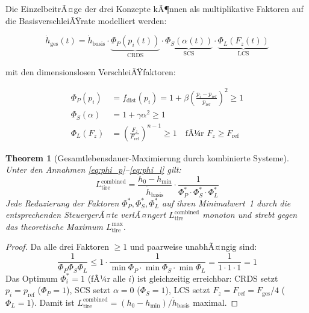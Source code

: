 ﻿\documentclass[12pt,a4paper]{article}
\newtheorem{theorem}{Theorem}[section]
\theoremstyle{definition}
\theoremstyle{remark}
\newcommand{\Ltire}{L_{\mathrm{tire}}}
\newcommand{\pref}{p_{\mathrm{ref}}}
\newcommand{\Fz}{F_z}
\begin{document}
Die EinzelbeitrÃ¤ge der drei Konzepte kÃ¶nnen als multiplikative Faktoren
auf die BasisverschleiÃŸrate modelliert werden:

\begin{equation}
  \dot{h}_{\mathrm{ges}}(t) = \dot{h}_{\mathrm{basis}} \cdot
    \underbrace{\Phi_P(p_i(t))}_{\text{CRDS}} \cdot
    \underbrace{\Phi_S(\alpha(t))}_{\text{SCS}} \cdot
    \underbrace{\Phi_L(\Fz(t))}_{\text{LCS}}
  \label{eq:total_wear}
\end{equation}

mit den dimensionslosen VerschleiÃŸfaktoren:

\begin{align}
  \Phi_P(p_i) &= f_{\mathrm{dist}}(p_i) = 1 + \beta\left(\frac{p_i - \pref}{\pref}\right)^2
                \geq 1 \label{eq:phi_p}\\
  \Phi_S(\alpha) &= 1 + \gamma \alpha^2 \geq 1 \label{eq:phi_s}\\
  \Phi_L(\Fz) &= \left(\frac{\Fz}{F_{\mathrm{ref}}}\right)^{n-1} \geq 1
    \quad\text{fÃ¼r } \Fz \geq F_{\mathrm{ref}} \label{eq:phi_l}
\end{align}

\begin{theorem}[Gesamtlebensdauer-Maximierung durch kombinierte Systeme]
\label{thm:combined}
Unter den Annahmen \eqref{eq:phi_p}--\eqref{eq:phi_l} gilt:
\begin{equation}
  \Ltire^{\mathrm{combined}} = \frac{h_0 - h_{\min}}{\dot{h}_{\mathrm{basis}}} \cdot
    \frac{1}{\Phi_P^* \cdot \Phi_S^* \cdot \Phi_L^*}
  \label{eq:life_combined}
\end{equation}
Jede Reduzierung der Faktoren $\Phi_P^*, \Phi_S^*, \Phi_L^*$ auf ihren
Minimalwert~1 durch die entsprechenden SteuergerÃ¤te verlÃ¤ngert $\Ltire^{\mathrm{combined}}$
monoton und strebt gegen das theoretische Maximum $\Ltire^{\max}$.
\end{theorem}

\begin{proof}
Da alle drei Faktoren $\geq 1$ und paarweise unabhÃ¤ngig sind:
\begin{equation}
  \frac{1}{\Phi_P \Phi_S \Phi_L} \leq 1 \cdot \frac{1}{\min \Phi_P \cdot \min \Phi_S \cdot \min \Phi_L}
    = \frac{1}{1 \cdot 1 \cdot 1} = 1
\end{equation}
Das Optimum $\Phi_i^* = 1$ (fÃ¼r alle $i$) ist gleichzeitig erreichbar:
CRDS setzt $p_i = \pref$ ($\Phi_P = 1$), SCS setzt $\alpha = 0$ ($\Phi_S = 1$),
LCS setzt $\Fz = F_{\mathrm{ref}} = F_{\mathrm{ges}}/4$ ($\Phi_L = 1$).
Damit ist $\Ltire^{\mathrm{combined}} = (h_0 - h_{\min}) / \dot{h}_{\mathrm{basis}}$
maximal.
\end{proof}
\end{document}

